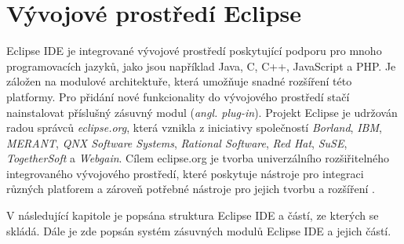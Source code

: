 \chapter{Vývojové prostředí Eclipse}                                      %
\label{chapter:eclipse_ide}
Eclipse IDE je integrované vývojové prostředí poskytující podporu pro mnoho programovacích jazyků, jako jsou například Java, C, C++, JavaScript a PHP.  Je záložen na modulové architektuře, která umožňuje snadné rozšíření této platformy. Pro přidání nové funkcionality do vývojového prostředí stačí nainstalovat příslušný zásuvný modul (\emph{angl. plug-in}). Projekt Eclipse je udržován radou správců \emph{eclipse.org}, která vznikla z iniciativy společností \emph{Borland}, \emph{IBM}, \emph{MERANT}, \emph{QNX Software Systems}, \emph{Rational Software}, \emph{Red Hat}, \emph{SuSE}, \emph{TogetherSoft} a \emph{Webgain}. Cílem eclipse.org je tvorba univerzálního rozšiřitelného integrovaného vývojového prostředí, které poskytuje nástroje pro integraci různých platforem a zároveň potřebné nástroje pro jejich tvorbu a rozšíření \cite{eclipse-org}.

V následující kapitole je popsána struktura Eclipse IDE a částí, ze kterých se skládá. Dále je zde popsán systém zásuvných modulů Eclipse IDE a jejich částí.

